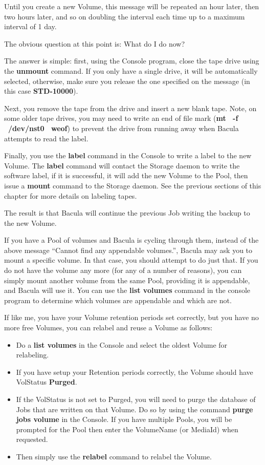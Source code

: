 {{Until you create a new Volume, this message will be repeated an hour later,
then two hours later, and so on doubling the interval each time up to a
maximum interval of 1 day. 

The obvious question at this point is: What do I do now? 

The answer is simple: first, using the Console program, close the tape drive
using the {\bf unmount} command. If you only have a single drive, it will be
automatically selected, otherwise, make sure you release the one specified on
the message (in this case {\bf STD-10000}). 

Next, you remove the tape from the drive and insert a new blank tape. Note, on
some older tape drives, you may need to write an end of file mark ({\bf mt \
-f \ /dev/nst0 \ weof}) to prevent the drive from running away when Bacula
attempts to read the label. 

Finally, you use the {\bf label} command in the Console to write a label to
the new Volume. The {\bf label} command will contact the Storage daemon to
write the software label, if it is successful, it will add the new Volume to
the Pool, then issue a {\bf mount} command to the Storage daemon. See the
previous sections of this chapter for more details on labeling tapes. 

The result is that Bacula will continue the previous Job writing the backup to
the new Volume. 

If you have a Pool of volumes and Bacula is cycling through them, instead of
the above message ``Cannot find any appendable volumes.'', Bacula may ask you
to mount a specific volume. In that case, you should attempt to do just that.
If you do not have the volume any more (for any of a number of reasons), you
can simply mount another volume from the same Pool, providing it is
appendable, and Bacula will use it. You can use the {\bf list volumes} command
in the console program to determine which volumes are appendable and which are
not. 

If like me, you have your Volume retention periods set correctly, but you have
no more free Volumes, you can relabel and reuse a Volume as follows: 

\begin{itemize}
\item Do a {\bf list volumes} in the Console and select the oldest  Volume for
   relabeling.  
\item If you have setup your Retention periods correctly, the  Volume should
   have VolStatus {\bf Purged}.  
\item If the VolStatus is not set to Purged, you will need to purge  the
   database of Jobs that are written on that Volume. Do so  by using the command
   {\bf purge jobs volume} in the Console.  If you have multiple Pools, you will
be prompted for the  Pool then enter the VolumeName (or MediaId) when
requested.  
\item Then simply use the {\bf relabel} command to relabel the  Volume. 
   \end{itemize}

}}
